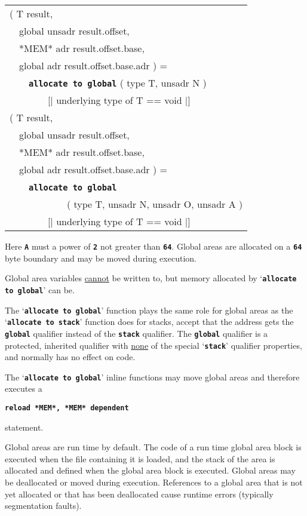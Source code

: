 \documentclass[12pt]{article}
\makeatletter
\newcommand{\TT}[1]{{\tt \bfseries #1}}
\newcommand{\ttkey}[1]{\TT{#1}\index{#1@{\tt #1}}}
\newenvironment{indpar}[1][0.3in]%
	{\begin{list}{}%
		     {\setlength{\itemsep}{0in}%
		      \setlength{\topsep}{0in}%
		      \setlength{\parsep}{1ex}%
		      \setlength{\labelwidth}{#1}%
		      \setlength{\leftmargin}{#1}%
		      \addtolength{\leftmargin}{\labelsep}}%
	 \item}%
	{\end{list}}
\makeatother
\begin{document}
\begin{indpar}\tt\begin{tabular}{l}
( T result, \\
~~global unsadr result.offset, \\
~~*MEM* adr result.offset.base, \\
~~global adr result.offset.base.adr  ) = \\
~~~~\ttkey{allocate to global} ( type T, unsadr N ) \\
~~~~~~~~[| underlying type of T == void |]
\\[1ex]
( T result, \\
~~global unsadr result.offset, \\
~~*MEM* adr result.offset.base, \\
~~global adr result.offset.base.adr  ) = \\
~~~~\ttkey{allocate to global} \\
~~~~~~~~~~~~( type T, unsadr N, unsadr O, unsadr A ) \\
~~~~~~~~[| underlying type of T == void |]
\end{tabular}\end{indpar}\label{ALLOCATE-TO-GLOBAL}

Here \TT{A} must a power of \TT{2} not greater than \TT{64}.
Global areas are allocated on a \TT{64} byte boundary and
may be moved during execution.

Global area variables \underline{cannot} be written to, but memory allocated
by `\TT{allocate to global}' can be.

The `\TT{allocate to global}' function plays the same role for
global areas as the `\TT{allocate to stack}' function does for
stacks, accept that the address gets the \TT{global} qualifier
instead of the \TT{stack} qualifier.  The \TT{global} qualifier
is a protected, inherited qualifier
with \underline{none} of the special `\TT{stack}'
qualifier properties, and normally has no effect on code.

The `\TT{allocate to global}' inline functions may move
global areas and therefore executes a
\begin{center}
\TT{reload *MEM*, *MEM* dependent}
\end{center}
statement.

Global areas are run time by default.
The code of a run time
global area block is executed when the file containing it is
loaded, and the stack of the area is allocated and defined when
the global area block is executed.
Global areas may be deallocated or moved during execution.
References to a global area
that is not yet allocated or that has been deallocated cause runtime
errors (typically segmentation faults).
\end{document}

